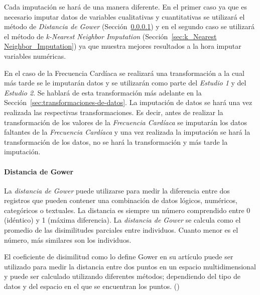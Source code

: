 Cada imputación se hará de una manera diferente. En el primer caso ya que es necesario imputar datos de variables cualitativas y cuantitativas se utilizará el método de \textit{Distancia de Gower} (Sección~\ref{sec:gower_distance}) y en el segundo caso se utilizará el método de \textit{k-Nearest Neighbor Imputation} (Sección~\ref{sec:k_Nearest Neighbor_Imputation}) ya que muestra mejores resultados a la hora imputar variables numéricas.

En el caso de la Frecuencia Cardíaca se realizará una transformación a la cual más tarde se le imputarán datos y se utilizarán como parte del \textit{Estudio 1} y del \textit{Estudio 2}. Se hablará de esta transformación más adelante en la Sección~\ref{sec:transformaciones-de-datos}. La imputación de datos se hará una vez realizada las respectivas transformaciones. Es decir, antes de realizar la transformación de los valores de la \textit{Frecuencia Cardíaca} se imputarán los datos faltantes de la \textit{Frecuencia Cardíaca} y una vez realizada la imputación se hará la  transformación de los datos, no se hará la transformación y más tarde la imputación.

\paragraph{Distancia de Gower}\label{sec:gower_distance}

La \textit{distancia de Gower} puede utilizarse para medir la diferencia entre dos registros que pueden contener una combinación de datos lógicos, numéricos, categóricos o textuales. La distancia es siempre un número comprendido entre 0 (idéntico) y 1 (máxima diferencia). La \textit{distancia de Gower} se calcula como el promedio de las disimilitudes parciales entre individuos. Cuanto menor es el número, más similares son los individuos.

El coeficiente de disimilitud como lo define Gower en su artículo puede ser utilizado para medir la distancia entre dos puntos en un espacio multidimensional y puede ser calculado utilizando diferentes métodos; dependiendo del tipo de datos y del espacio en el que se encuentran los puntos. (\cite{Gower1971})

